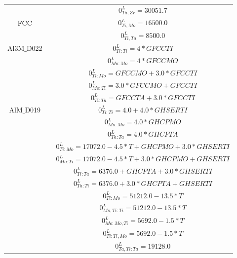 \begin{longtable}[H]{ c c c }
                  & \cite{Guillermet1995} & $0^\textit{L}_{Ta,Zr} = 30051.7$\\
           FCC & \cite{Ansara1998} & $0^\textit{L}_{Ti,Mo} = 16500.0$\\
                  & \cite{Ansara1998} & $0^\textit{L}_{Ti,Ta} = 8500.0$\\
    Al3M$\_$D022 & \cite{Ansara1998} & $0^\textit{L}_{Ti:Ti} = 4*GFCCTI$\\
                            & \cite{Ansara1998} & $0^\textit{L}_{Mo:Mo} = 4*GFCCMO$\\
                            & \cite{Ansara1998} & $0^\textit{L}_{Ti:Mo} = GFCCMO+3.0*GFCCTI$\\
                            & \cite{Ansara1998} & $0^\textit{L}_{Mo:Ti} = 3.0*GFCCMO+GFCCTI$\\
                            & \cite{Ansara1998} & $0^\textit{L}_{Ti:Ta} = GFCCTA+3.0*GFCCTI$\\
         AlM$\_$D019 & \cite{Ansara1998} & $0^\textit{L}_{Ti:Ti} = 4.0+4.0*GHSERTI$\\
                              & \cite{Ansara1998} & $0^\textit{L}_{Mo:Mo} = 4.0*GHCPMO$\\
                              & \cite{Ansara1998} & $0^\textit{L}_{Ta:Ta} = 4.0*GHCPTA$\\
                              & \cite{Ansara1998} & $0^\textit{L}_{Ti:Mo} = 17072.0-4.5*T+GHCPMO+3.0*GHSERTI$\\
                              & \cite{Ansara1998} & $0^\textit{L}_{Mo:Ti} = 17072.0-4.5*T+3.0*GHCPMO+GHSERTI$\\
                              & \cite{Ansara1998} & $0^\textit{L}_{Ti:Ta} = 6376.0+GHCPTA+3.0*GHSERTI$\\
                              & \cite{Ansara1998} & $0^\textit{L}_{Ta:Ti} = 6376.0+3.0*GHCPTA+GHSERTI$\\
                              & \cite{Ansara1998} & $0^\textit{L}_{Ti:Mo} = 51212.0-13.5*T$\\
                              & \cite{Ansara1998} & $0^\textit{L}_{Mo,Ti:Ti} = 51212.0-13.5*T$\\
                              & \cite{Ansara1998} & $0^\textit{L}_{Mo:Mo,Ti} = 5692.0-1.5*T$\\
                              & \cite{Ansara1998} & $0^\textit{L}_{Ti:Ti,Mo} = 5692.0-1.5*T$\\
                              & \cite{Ansara1998} & $0^\textit{L}_{Ta,Ti:Ta} = 19128.0$\\

\end{longtable}
